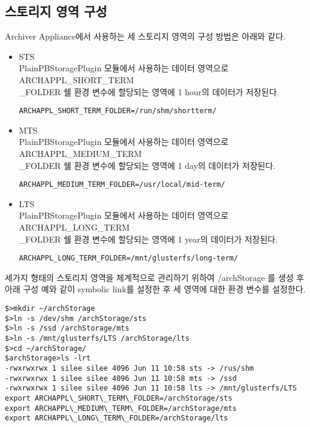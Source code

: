 \documentclass[11pt
  , a4paper
  , article
  , oneside
]{memoir}
\begin{document}
\subsection{스토리지 영역 구성}
Archiver Appliance에서 사용하는 세 스토리지 영역의 구성 방법은 아래와 같다.
\begin{itemize}
	\item STS \\
	PlainPBStoragePlugin 모듈에서 사용하는 데이터 영역으로 ARCHAPPL\_SHORT\_TERM\\\_FOLDER 쉘 환경 변수에 할당되는 영역에 1 hour의 데이터가 저장된다.
	\begin{lstlisting}[style=termstyle]
	ARCHAPPL_SHORT_TERM_FOLDER=/run/shm/shortterm/
	\end{lstlisting}
	\item MTS \\
	PlainPBStoragePlugin 모듈에서 사용하는 데이터 영역으로 ARCHAPPL\_MEDIUM\_TERM\\\_FOLDER 쉘 환경 변수에 할당되는 영역에 1 day의 데이터가 저장된다.
	\begin{lstlisting}[style=termstyle]
	ARCHAPPL_MEDIUM_TERM_FOLDER=/usr/local/mid-term/
	\end{lstlisting}
	\item LTS \\
	PlainPBStoragePlugin 모듈에서 사용하는 데이터 영역으로 ARCHAPPL\_LONG\_TERM\\\_FOLDER 쉘 환경 변수에 할당되는 영역에 1 year의 데이터가 저장된다.
	\begin{lstlisting}[style=termstyle]
	ARCHAPPL_LONG_TERM_FOLDER=/mnt/glusterfs/long-term/
	\end{lstlisting}
\end{itemize}
세가지 형태의 스토리지 영역을 체계적으로 관리하기 위하여 /archStorage 를 생성 후 아래 구성 예와 같이 symbolic link를 설정한 후 세 영역에 대한 환경 변수를 설정한다.

\begin{lstlisting}[style=termstyle]
$>mkdir ~/archStorage
$>ln -s /dev/shm /archStorage/sts
$>ln -s /ssd /archStorage/mts
$>ln -s /mnt/glusterfs/LTS /archStorage/lts
$>cd ~/archStorage/
$archStorage>ls -lrt
-rwxrwxrwx 1 silee silee 4096 Jun 11 10:58 sts -> /rus/shm
-rwxrwxrwx 1 silee silee 4096 Jun 11 10:58 mts -> /ssd
-rwxrwxrwx 1 silee silee 4096 Jun 11 10:58 lts -> /mnt/glusterfs/LTS
export ARCHAPPL\_SHORT\_TERM\_FOLDER=/archStorage/sts
export ARCHAPPL\_MEDIUM\_TERM\_FOLDER=/archStorage/mts
export ARCHAPPL\_LONG\_TERM\_FOLDER=/archStorage/lts
\end{lstlisting} 
\end{document}
